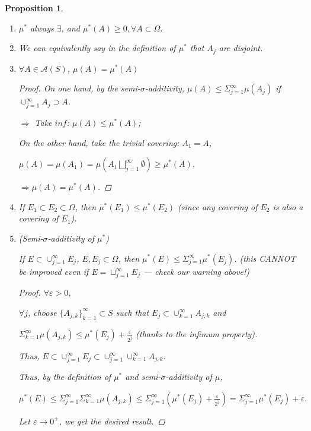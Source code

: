 \documentclass[12pt]{article}
\theoremstyle{blueplain}
\newtheorem{proposition}[theorem]{Proposition}
\theoremstyle{bluedef}
\theoremstyle{blueremark}
\newcommand{\eps}{\varepsilon}
\numberwithin{equation}{section}
\begin{document}
\begin{proposition}
  \begin{enumerate}
    \item $\mu^*$ always $\exists$, and $\mu^*(A) \geq 0, \forall A \subset \Omega$.
    \item We can equivalently say in the definition of $\mu^*$ that $A_j$ are disjoint.
    \item $\forall A \in \mathcal{A}(S)$, $\mu(A) = \mu^*(A)$
          \begin{proof}
            On one hand, by the semi-$\sigma$-additivity, $\mu(A) \leq \Sigma_{j=1}^{\infty} \mu(A_j)$ if $\cup_{j=1}^{\infty} A_j \supset A$.

            $\Rightarrow$ Take $inf$: $\mu(A) \leq \mu^*(A)$;

            On the other hand, take the trivial covering: $A_1 = A$,

            $\mu(A) = \mu(A_1) = \mu(A_1 \bigsqcup_{j=1}^{\infty}\emptyset) \geq \mu^*(A)$,

            $\Rightarrow \mu(A) = \mu^*(A)$.
          \end{proof}
    \item If $E_1 \subset E_2 \subset \Omega$, then $\mu^*(E_1) \leq \mu^*(E_2)$ (since any covering of $E_2$ is also a covering of $E_1$).
    \item (\emph{Semi-$\sigma$-additivity of $\mu^*$})

          If $E \subset \cup_{j=1}^\infty E_j$, $E,E_j \subset \Omega$, then $\mu^*(E) \leq \Sigma_{j=1}^\infty \mu^*(E_j)$. (this CANNOT be improved even if $E = \sqcup_{j=1}^{\infty} E_j$ --- check our warning above!)
          \begin{proof}
            $\forall \eps > 0$,

            $\forall j$, choose $\{A_{j,k}\}_{k=1}^{\infty} \subset S$ such that $E_j \subset \cup_{k=1}^{\infty} A_{j,k}$ and

            \(\Sigma_{k=1}^{\infty} \mu(A_{j,k}) \leq \mu^*(E_j) + \frac{\eps}{2^j}\) (thanks to the infimum property).

            Thus, \(E \subset \cup_{j=1}^{\infty} E_j \subset \cup_{j=1}^{\infty} \cup_{k=1}^{\infty} A_{j,k}.\)

            Thus, by the definition of $\mu^*$ and semi-$\sigma$-additivity of $\mu$,

            \(\mu^*(E) \leq \Sigma_{j=1}^{\infty} \Sigma_{k=1}^{\infty} \mu(A_{j,k}) \leq \Sigma_{j=1}^{\infty} \left( \mu^*(E_j) + \frac{\eps}{2^j} \right) = \Sigma_{j=1}^{\infty} \mu^*(E_j) + \eps.\)

            Let $\eps \rightarrow 0^+$, we get the desired result.
          \end{proof}
  \end{enumerate}
\end{proposition}
\end{document}
